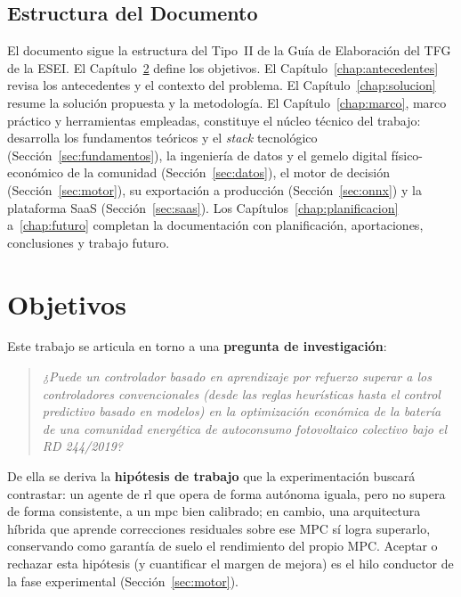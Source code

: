 \documentclass[12pt, a4paper, twoside]{report}
\begin{document}
\section{Estructura del Documento}

El documento sigue la estructura del Tipo~II de la Guía de Elaboración del TFG
de la ESEI. El Capítulo~\ref{chap:objetivos} define los objetivos. El
Capítulo~\ref{chap:antecedentes} revisa los antecedentes y el contexto del
problema. El Capítulo~\ref{chap:solucion} resume la solución propuesta y la
metodología. El Capítulo~\ref{chap:marco}, marco práctico y herramientas
empleadas, constituye el núcleo técnico del trabajo: desarrolla los fundamentos
teóricos y el \textit{stack} tecnológico (Sección~\ref{sec:fundamentos}), la
ingeniería de datos y el gemelo digital físico-económico de la comunidad
(Sección~\ref{sec:datos}), el motor de decisión (Sección~\ref{sec:motor}), su
exportación a producción (Sección~\ref{sec:onnx}) y la plataforma SaaS
(Sección~\ref{sec:saas}). Los Capítulos~\ref{chap:planificacion}
a~\ref{chap:futuro} completan la documentación con planificación, aportaciones,
conclusiones y trabajo futuro.

\chapter{Objetivos}
\label{chap:objetivos}

Este trabajo se articula en torno a una \textbf{pregunta de investigación}:

\begin{quote}
\itshape ¿Puede un controlador basado en aprendizaje por refuerzo superar a los
controladores convencionales (desde las reglas heurísticas hasta el control
predictivo basado en modelos) en la optimización económica de la batería de una
comunidad energética de autoconsumo fotovoltaico colectivo bajo el RD 244/2019?
\end{quote}

De ella se deriva la \textbf{hipótesis de trabajo} que la experimentación
buscará contrastar: un agente de \acrshort{rl} que opera de forma autónoma
iguala, pero no supera de forma consistente, a un \acrshort{mpc} bien calibrado;
en cambio, una arquitectura híbrida que aprende correcciones residuales sobre
ese MPC sí logra superarlo, conservando como garantía de suelo el rendimiento
del propio MPC. Aceptar o rechazar esta hipótesis (y cuantificar el margen de
mejora) es el hilo conductor de la fase experimental (Sección~\ref{sec:motor}).
\end{document}
